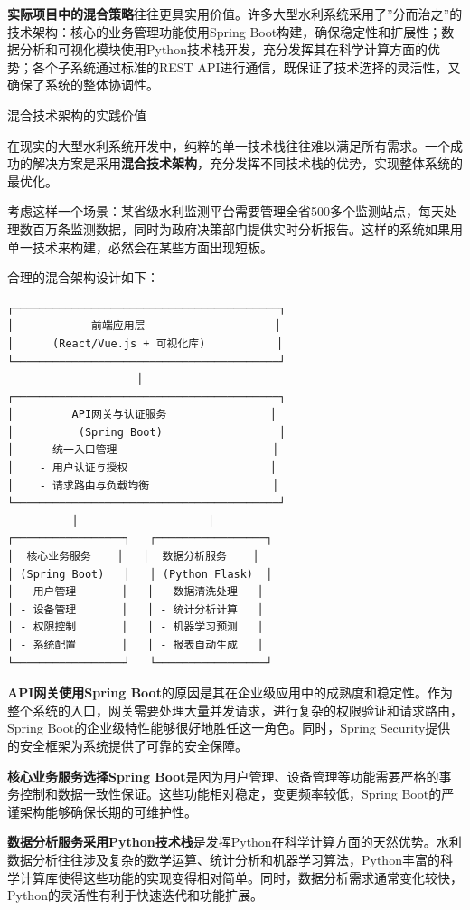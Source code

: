 \textbf{实际项目中的混合策略}往往更具实用价值。许多大型水利系统采用了''分而治之''的技术架构：核心的业务管理功能使用Spring Boot构建，确保稳定性和扩展性；数据分析和可视化模块使用Python技术栈开发，充分发挥其在科学计算方面的优势；各个子系统通过标准的REST API进行通信，既保证了技术选择的灵活性，又确保了系统的整体协调性。

 混合技术架构的实践价值

在现实的大型水利系统开发中，纯粹的单一技术栈往往难以满足所有需求。一个成功的解决方案是采用\textbf{混合技术架构}，充分发挥不同技术栈的优势，实现整体系统的最优化。

考虑这样一个场景：某省级水利监测平台需要管理全省500多个监测站点，每天处理数百万条监测数据，同时为政府决策部门提供实时分析报告。这样的系统如果用单一技术来构建，必然会在某些方面出现短板。

合理的混合架构设计如下：

\begin{lstlisting}
┌─────────────────────────────────────────┐
│            前端应用层                    │
│      (React/Vue.js + 可视化库)           │
└─────────────────────────────────────────┘
                    │
┌─────────────────────────────────────────┐
│         API网关与认证服务                │
│          (Spring Boot)                  │
│    - 统一入口管理                        │
│    - 用户认证与授权                      │
│    - 请求路由与负载均衡                   │
└─────────────────────────────────────────┘
          │                    │
┌─────────────────┐   ┌─────────────────┐
│  核心业务服务    │   │  数据分析服务    │
│ (Spring Boot)   │   │ (Python Flask)  │
│ - 用户管理       │   │ - 数据清洗处理   │
│ - 设备管理       │   │ - 统计分析计算   │
│ - 权限控制       │   │ - 机器学习预测   │
│ - 系统配置       │   │ - 报表自动生成   │
└─────────────────┘   └─────────────────┘
\end{lstlisting}

\textbf{API网关使用Spring Boot}的原因是其在企业级应用中的成熟度和稳定性。作为整个系统的入口，网关需要处理大量并发请求，进行复杂的权限验证和请求路由，Spring Boot的企业级特性能够很好地胜任这一角色。同时，Spring Security提供的安全框架为系统提供了可靠的安全保障。

\textbf{核心业务服务选择Spring Boot}是因为用户管理、设备管理等功能需要严格的事务控制和数据一致性保证。这些功能相对稳定，变更频率较低，Spring Boot的严谨架构能够确保长期的可维护性。

\textbf{数据分析服务采用Python技术栈}是发挥Python在科学计算方面的天然优势。水利数据分析往往涉及复杂的数学运算、统计分析和机器学习算法，Python丰富的科学计算库使得这些功能的实现变得相对简单。同时，数据分析需求通常变化较快，Python的灵活性有利于快速迭代和功能扩展。

